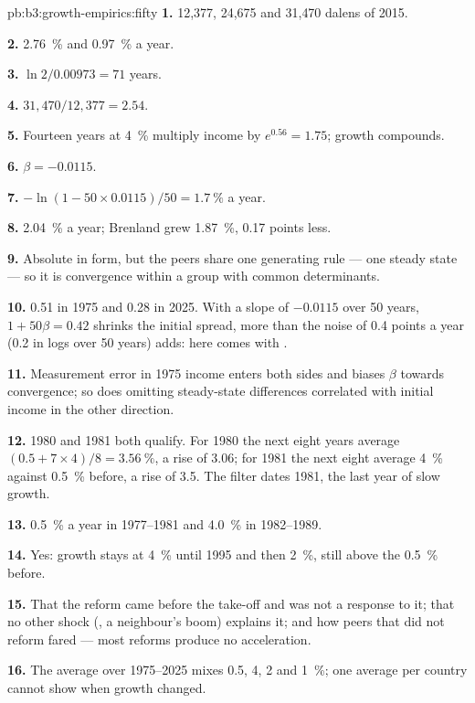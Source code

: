 \begin{solution}{pb:b3:growth-empirics:fifty}
\textbf{1.} 12{,}377, 24{,}675 and 31{,}470 dalens of 2015.

\textbf{2.} 2.76~\% and 0.97~\% a year.

\textbf{3.} $\ln 2/0.00973 = 71$ years.

\textbf{4.} $31{,}470/12{,}377 = 2.54$.

\textbf{5.} Fourteen years at 4~\% multiply income by $e^{0.56} = 1.75$; growth compounds.

\textbf{6.} $\beta = -0.0115$.

\textbf{7.} $-\ln(1 - 50 \times 0.0115)/50 = 1.7~\%$ a year.

\textbf{8.} 2.04~\% a year; Brenland grew 1.87~\%, 0.17 points less.

\textbf{9.} Absolute in form, but the peers share one generating rule --- one steady
state --- so it is convergence within a group with common determinants.

\textbf{10.} 0.51 in 1975 and 0.28 in 2025. With a slope of $-0.0115$ over 50 years, $1 + 50\beta = 0.42$ shrinks the initial
spread, more than the noise of 0.4 points a year (0.2 in logs over 50 years) adds: here  comes with .

\textbf{11.} Measurement error in 1975 income enters both sides and biases $\beta$ towards
convergence; so does omitting steady-state differences correlated with initial
income in the other direction.

\textbf{12.} 1980 and 1981 both qualify. For 1980 the next eight years average
$(0.5 + 7 \times 4)/8 = 3.56~\%$, a rise of 3.06; for 1981 the next eight average 4~\% against 0.5~\%
before, a rise of 3.5. The filter dates 1981, the last year of slow growth.

\textbf{13.} 0.5~\% a year in 1977--1981 and 4.0~\% in 1982--1989.

\textbf{14.} Yes: growth stays at 4~\% until 1995 and then 2~\%, still above the 0.5~\% before.

\textbf{15.} That the reform came before the take-off and was not a response to it;
that no other shock (, a neighbour's boom) explains it; and how peers
that did not reform fared --- most reforms produce no acceleration.

\textbf{16.} The average over 1975--2025 mixes 0.5, 4, 2 and 1~\%; one average per country
cannot show when growth changed.


\end{solution}
